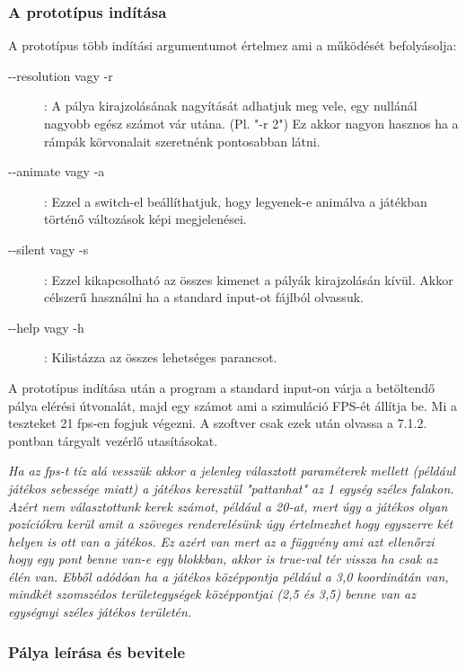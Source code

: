 \subsubsection{A prototípus indítása}

A prototípus több indítási argumentumot értelmez ami a működését befolyásolja:

\begin{description}
	\item[-{}-resolution vagy -r]: A pálya kirajzolásának nagyítását adhatjuk meg vele, egy nullánál nagyobb egész számot vár utána. (Pl. "-r 2") Ez akkor nagyon hasznos ha a rámpák körvonalait szeretnénk pontosabban látni.
	\item[-{}-animate vagy -a]: Ezzel a switch-el beállíthatjuk, hogy legyenek-e animálva a játékban történő változások képi megjelenései.
	\item[-{}-silent vagy -s]: Ezzel kikapcsolható az összes kimenet a pályák kirajzolásán kívül. Akkor célszerű használni ha a standard input-ot fájlból olvassuk.
	\item[-{}-help vagy -h]: Kilistázza az összes lehetséges parancsot.
\end{description}

A prototípus indítása után a program a standard input-on várja a betöltendő pálya elérési útvonalát, majd egy számot ami a szimuláció FPS-ét állítja be. Mi a teszteket 21 fps-en fogjuk végezni. A szoftver csak ezek után olvassa a 7.1.2. pontban tárgyalt vezérlő utasításokat.

\emph{Ha az fps-t tíz alá vesszük akkor a jelenleg választott paraméterek mellett (például játékos sebessége miatt) a játékos keresztül "pattanhat" az 1 egység széles falakon. Azért nem választottunk kerek számot, például a 20-at, mert úgy a játékos olyan pozíciókra kerül amit a szöveges renderelésünk úgy értelmezhet hogy egyszerre két helyen is ott van a játékos. Ez azért van mert az a függvény ami azt ellenőrzi hogy egy pont benne van-e egy blokkban, akkor is true-val tér vissza ha csak az élén van. Ebből adódóan ha a játékos középpontja például a 3,0 koordinátán van, mindkét szomszédos területegységek középpontjai (2,5 és 3,5) benne van az egységnyi széles játékos területén.}

\newpage

\subsubsection{Pálya leírása és bevitele}

